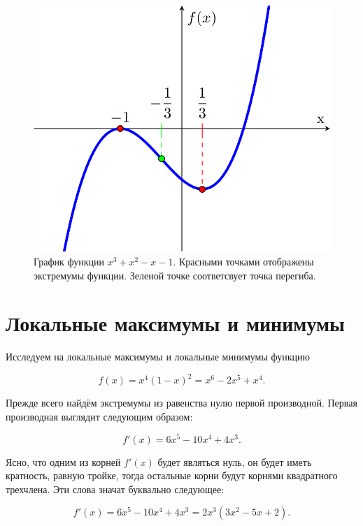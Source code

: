 \documentclass[12pt]{article}
\begin{document}
\begin{figure}[htbp]
	\centering
	\includegraphics[width=\linewidth]{fig8}
	\caption{График функции $x^3 + x^2 - x -1$. Красными точками отображены экстремумы функции. Зеленой точке соответсвует точка перегиба.}
	\label{fig:73}
\end{figure}

\section{Локальные максимумы и минимумы} %
\label{sec:6}
Исследуем на локальные максимумы и локальные минимумы функцию 

\begin{equation}
	f(x) = x^4(1-x)^2 = x^6-2x^5+x^4.
\end{equation}

Прежде всего найдём экстремумы из равенства нулю первой производной. Первая производная выглядит следующим образом:

\begin{equation}
	f'(x) = 6x^5 -10x^4+4x^3.
\end{equation}

Ясно, что одним из корней $f'(x)$ будет являться нуль, он будет иметь кратность, равную тройке, тогда остальные корни будут корнями квадратного трехчлена. Эти слова значат буквально следующее:

\begin{equation}
	f'(x) = 6x^5 -10x^4+4x^3 = 2x^3(3x^2 - 5x + 2).
\end{equation}
\end{document}
